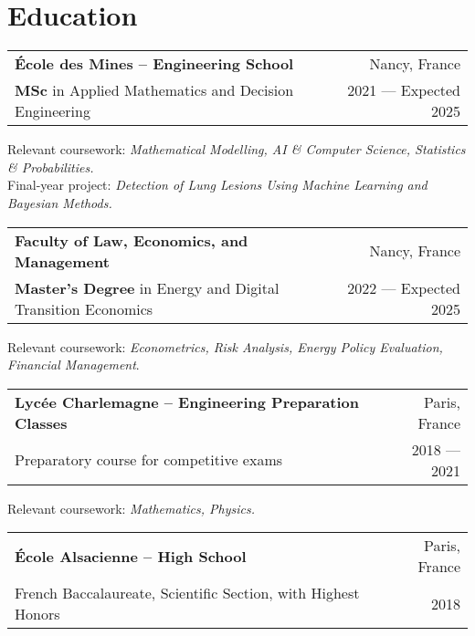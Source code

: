 \documentclass[a4paper,9pt]{extarticle}
\begin{document}
\section*{\faGraduationCap \hspace{0.1em} Education}

\begin{tabularx}{\textwidth}{@{}Xr@{}}
\textbf{École des Mines -- Engineering School} & Nancy, France\\
\textbf{MSc} in Applied Mathematics and Decision Engineering & 2021 — Expected 2025\\
\end{tabularx}
Relevant coursework: \textit{Mathematical Modelling, AI \& Computer Science, Statistics \& Probabilities.} \\
Final-year project: \textit{Detection of Lung Lesions Using Machine Learning and Bayesian Methods.}

\vspace{5pt} %
\noindent
\begin{tabularx}{\textwidth}{@{}Xr@{}}
\textbf{Faculty of Law, Economics, and Management} & Nancy, France\\
\textbf{Master’s Degree} in Energy and Digital Transition Economics & 2022 — Expected 2025\\
\end{tabularx}
Relevant coursework: \textit{Econometrics, Risk Analysis, Energy Policy Evaluation, Financial Management}.

\vspace{5pt} %
\noindent
\begin{tabularx}{\textwidth}{@{}Xr@{}}
\textbf{Lycée Charlemagne -- Engineering Preparation Classes} & Paris, France\\
Preparatory course for competitive exams & 2018 — 2021\\
\end{tabularx}
Relevant coursework: \textit{Mathematics, Physics.}

\vspace{5pt} %
\noindent
\begin{tabularx}{\textwidth}{@{}Xr@{}}
\textbf{École Alsacienne -- High School} & Paris, France\\
French Baccalaureate, Scientific Section, with Highest Honors & 2018\\
\end{tabularx}

\vspace{6pt}
\end{document}
